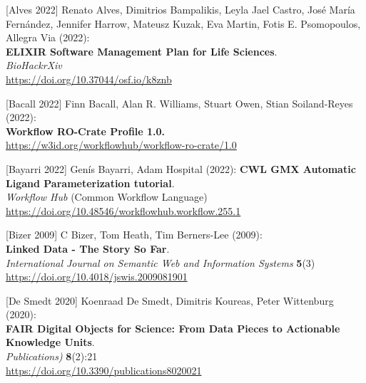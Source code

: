 {[}Alves 2022{]} Renato Alves, Dimitrios Bampalikis, Leyla Jael Castro,
José María Fernández, Jennifer Harrow, Mateusz Kuzak, Eva Martin, Fotis
E. Psomopoulos, Allegra Via (2022):\\
\textbf{ELIXIR Software Management Plan for Life Sciences}.\\
\emph{BioHackrXiv}\\
\url{https://doi.org/10.37044/osf.io/k8znb}

{[}Bacall 2022{]} Finn Bacall, Alan R. Williams, Stuart Owen, Stian
Soiland-Reyes (2022):\\
\textbf{Workflow RO-Crate Profile 1.0.}\\
\url{https://w3id.org/workflowhub/workflow-ro-crate/1.0}

{[}Bayarri 2022{]} Genís Bayarri, Adam Hospital (2022): \textbf{CWL GMX
Automatic Ligand Parameterization tutorial}.\\
\emph{Workflow Hub} (Common Workflow Language)\\
\url{https://doi.org/10.48546/workflowhub.workflow.255.1}

{[}Bizer 2009{]} C Bizer, Tom Heath, Tim Berners-Lee (2009):\\
\textbf{Linked Data - The Story So Far}.\\
\emph{International Journal on Semantic Web and Information Systems}
\textbf{5}(3)\\
\url{https://doi.org/10.4018/jswis.2009081901}

{[}De Smedt 2020{]} Koenraad De Smedt, Dimitris Koureas, Peter
Wittenburg (2020):\\
\textbf{FAIR Digital Objects for Science: From Data Pieces to Actionable
Knowledge Units}.\\
\emph{Publications)} \textbf{8}(2):21\\
\url{https://doi.org/10.3390/publications8020021}

